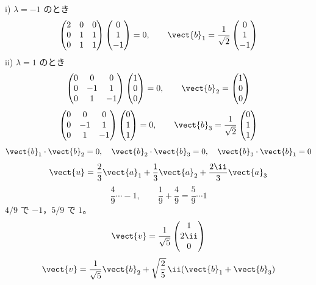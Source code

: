 i) $\lambda=-1$ のとき
\[ \begin{pmatrix}2&0&0\\0&1&1\\0&1&1\end{pmatrix}\begin{pmatrix}0\\1\\-1\end{pmatrix}=0,\qquad\vect{b}_{1}=\frac{1}{\sqrt{2}}\begin{pmatrix}0\\1\\-1\end{pmatrix} \]
ii) $\lambda=1$ のとき
\[ \begin{pmatrix}0&0&0\\0&-1&1\\0&1&-1\end{pmatrix}\begin{pmatrix}1\\0\\0\end{pmatrix}=0,\qquad\vect{b}_{2}=\begin{pmatrix}1\\0\\0\end{pmatrix} \]
\[ \begin{pmatrix}0&0&0\\0&-1&1\\0&1&-1\end{pmatrix}\begin{pmatrix}0\\1\\1\end{pmatrix}=0,\qquad\vect{b}_{3}=\frac{1}{\sqrt{2}}\begin{pmatrix}0\\1\\1\end{pmatrix} \]
\[ \vect{b}_{1}\cdot\vect{b}_{2}=0,\quad\vect{b}_{2}\cdot\vect{b}_{3}=0,\quad\vect{b}_{3}\cdot\vect{b}_{1}=0 \]
\[ \vect{u}=\frac{2}{3}\vect{a}_{1}+\frac{1}{3}\vect{a}_{2}+\frac{2\ii}{3}\vect{a}_{3} \]
\[ \frac{4}{9}\cdots-1,\qquad\frac{1}{9}+\frac{4}{9}=\frac{5}{9}\cdots1 \]
$4/9$ で $-1$，$5/9$ で $1$。
\[ \vect{v}=\frac{1}{\sqrt{5}}\begin{pmatrix}1\\2\ii\\0\end{pmatrix} \]
\[ \vect{v}=\frac{1}{\sqrt{5}}\vect{b}_{2}+\sqrt{\frac{2}{5}}\,\ii(\vect{b}_{1}+\vect{b}_{3}) \]
